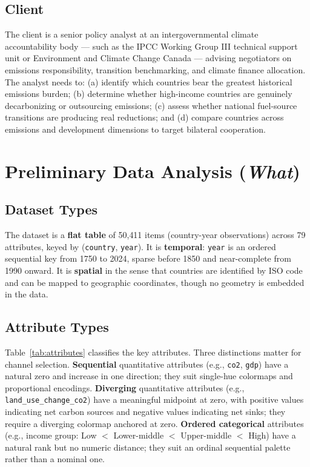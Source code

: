 \documentclass[10pt]{article}
\begin{document}
\subsection{Client}

The client is a senior policy analyst at an intergovernmental climate accountability body --- such as the IPCC Working Group III technical support unit or Environment and Climate Change Canada --- advising negotiators on emissions responsibility, transition benchmarking, and climate finance allocation. The analyst needs to: (a) identify which countries bear the greatest historical emissions burden; (b) determine whether high-income countries are genuinely decarbonizing or outsourcing emissions; (c) assess whether national fuel-source transitions are producing real reductions; and (d) compare countries across emissions and development dimensions to target bilateral cooperation.

\section{Preliminary Data Analysis (\emph{What})}
\label{sec:what}

\subsection{Dataset Types}

The dataset is a \textbf{flat table} of 50{,}411 items (country-year observations) across 79 attributes, keyed by (\texttt{country}, \texttt{year}). It is \textbf{temporal}: \texttt{year} is an ordered sequential key from 1750 to 2024, sparse before 1850 and near-complete from 1990 onward. It is \textbf{spatial} in the sense that countries are identified by ISO code and can be mapped to geographic coordinates, though no geometry is embedded in the data.

\subsection{Attribute Types}

Table~\ref{tab:attributes} classifies the key attributes. Three distinctions matter for channel selection. \textbf{Sequential} quantitative attributes (e.g., \texttt{co2}, \texttt{gdp}) have a natural zero and increase in one direction; they suit single-hue colormaps and proportional encodings. \textbf{Diverging} quantitative attributes (e.g., \texttt{land\_use\_change\_co2}) have a meaningful midpoint at zero, with positive values indicating net carbon sources and negative values indicating net sinks; they require a diverging colormap anchored at zero. \textbf{Ordered categorical} attributes (e.g., income group: Low $<$ Lower-middle $<$ Upper-middle $<$ High) have a natural rank but no numeric distance; they suit an ordinal sequential palette rather than a nominal one.
\end{document}
